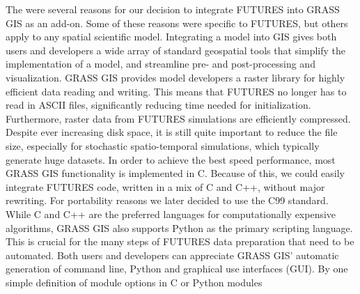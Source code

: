 \documentclass{isprs}
\begin{document}
The were several reasons for our decision to integrate FUTURES into GRASS GIS as an add-on. Some of these reasons were specific to FUTURES, but others apply to any spatial scientific model.
%
%
Integrating a model into GIS gives both users and developers
a wide array of standard geospatial tools that simplify the implementation of a model,
and streamline pre- and post-processing and visualization.
%
%
GRASS GIS provides
model developers
a raster library for highly efficient data reading and writing.
This means that FUTURES no longer has to read in ASCII files,
significantly reducing time needed for initialization.
Furthermore, raster data from FUTURES simulations are efficiently compressed.
Despite ever increasing disk space, it is still quite important to reduce the file size, especially for
stochastic spatio-temporal simulations, which typically generate huge datasets.
In order to achieve the best speed performance,
most GRASS GIS functionality is implemented in C.
Because of this, we could easily integrate FUTURES 
code, written in a mix of C and C++, 
without major rewriting. 
For portability reasons we later decided to use the C99 standard.
While C and C++ are the preferred languages for computationally expensive algorithms,
GRASS GIS also supports Python as the primary scripting language. 
This is crucial 
for the many steps of FUTURES data preparation 
that need to be automated.
Both users and developers 
can appreciate GRASS GIS' automatic generation of
command line, Python and graphical use interfaces (GUI).
By one simple definition of module options in C or Python modules
\end{document}
